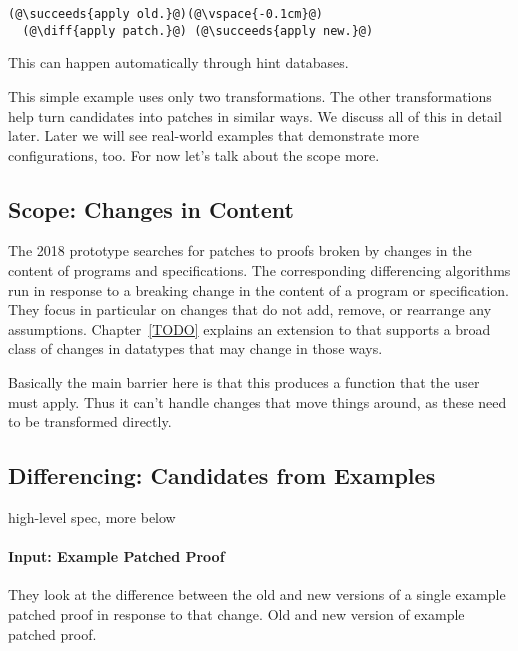 \begin{lstlisting}[language=coq]
  (@\succeeds{apply old.}@)(@\vspace{-0.1cm}@)
  (@\diff{apply patch.}@) (@\succeeds{apply new.}@)
\end{lstlisting}
This can happen automatically through hint databases.

This simple example uses only two transformations. The other transformations help turn candidates
into patches in similar ways. We discuss all of this in detail later.
Later we will see real-world examples that demonstrate more configurations, too.
For now let's talk about the scope more.

\subsection{Scope: Changes in Content}
\label{sec:pumpkin-scope}

The 2018 \sysname prototype searches for patches to proofs broken by changes in the content of programs and specifications.
The corresponding differencing algorithms run in response to a breaking change in the content of a program or specification. %
They focus in particular on changes that do not add, remove, or rearrange any assumptions.
Chapter~\ref{TODO} explains an extension to \sysname that supports a broad class of
changes in datatypes that may change in those ways.

Basically the main barrier here is that this produces a function that the user must apply.
Thus it can't handle changes that move things around, as these need to be transformed directly.

\subsection{Differencing: Candidates from Examples}
\label{sec:pumpkin-spec-diff}

high-level spec, more below

\paragraph{Input: Example Patched Proof}
They look at the difference between the old and new versions of a single example patched proof in response to that change.
Old and new version of example patched proof.

